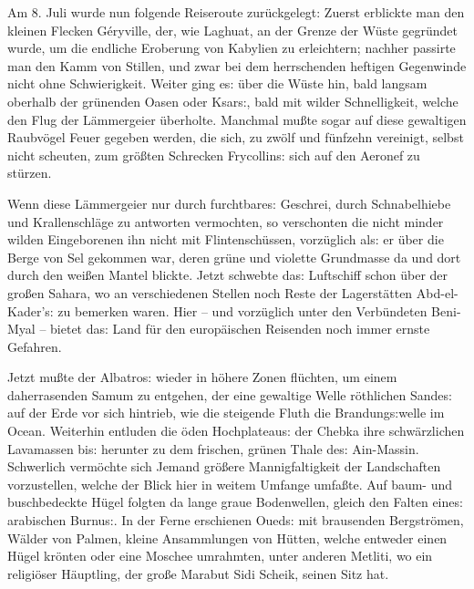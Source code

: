 \documentclass[oneside,12pt]{book}
\newcommand{\s}{s:}
\begin{document}
Am 8. Juli wurde nun folgende Reiseroute zur\"uckgelegt: Zuerst
erblickte man den kleinen Flecken G\'eryville, der, wie Laghuat, an
der Grenze der W\"uste gegr\"undet wurde, um die endliche Eroberung
von Kabylien zu erleichtern; nachher passirte man den Kamm von
Stillen, und zwar bei dem herrschenden heftigen Gegenwinde nicht ohne
Schwierigkeit. Weiter ging e{\s} \"uber die W\"uste hin, bald langsam
oberhalb der gr\"unenden Oasen oder Ksar{\s}, bald mit wilder
Schnelligkeit, welche den Flug der L\"ammergeier \"uberholte.
Manchmal mu{\ss}te sogar auf diese gewaltigen Raubv\"ogel Feuer
gegeben werden, die sich, zu zw\"olf und f\"unfzehn vereinigt, selbst
nicht scheuten, zum gr\"o{\ss}ten Schrecken Frycollin{\s} sich auf
den Aeronef zu st\"urzen.

Wenn diese L\"ammergeier nur durch furchtbare{\s} Geschrei, durch
Schnabelhiebe und Krallenschl\"age zu antworten vermochten, so
verschonten die nicht minder wilden Eingeborenen ihn nicht mit
Flintensch\"ussen, vorz\"uglich al{\s} er \"uber die Berge von Sel
gekommen war, deren gr\"une und violette Grundmasse da und dort durch
den wei{\ss}en Mantel blickte. Jetzt schwebte da{\s} Luftschiff schon
\"uber der gro{\ss}en Sahara, wo an verschiedenen Stellen noch Reste
der Lagerst\"atten Abd-el-Kader'{\s} zu bemerken waren. Hier -- und
vorz\"uglich unter den Verb\"undeten Beni-Myal -- bietet da{\s} Land
f\"ur den europ\"aischen Reisenden noch immer ernste Gefahren.

Jetzt mu{\ss}te der {\glqq}Albatro{\s}{\grqq} wieder in h\"ohere
Zonen fl\"uchten, um einem daherrasenden Samum zu entgehen, der eine
gewaltige Welle r\"othlichen Sande{\s} auf der Erde vor sich
hintrieb, wie die steigende Fluth die Brandung{\s}welle im Ocean.
Weiterhin entluden die \"oden Hochplateau{\s} der Chebka ihre
schw\"arzlichen Lavamassen bi{\s} herunter zu dem frischen, gr\"unen
Thale de{\s} Ain-Massin. Schwerlich verm\"ochte sich Jemand
gr\"o{\ss}ere Mannigfaltigkeit der Landschaften vorzustellen, welche
der Blick hier in weitem Umfange umfa{\ss}te. Auf baum- und
buschbedeckte H\"ugel folgten da lange graue Bodenwellen, gleich den
Falten eine{\s} arabischen Burnu{\s}. In der Ferne erschienen
{\glqq}Oued{\s}{\grqq} mit brausenden Bergstr\"omen, W\"alder von
Palmen, kleine Ansammlungen von H\"utten, welche entweder einen
H\"ugel kr\"onten oder eine Moschee umrahmten, unter anderen Metliti,
wo ein religi\"oser H\"auptling, der gro{\ss}e Marabut Sidi Scheik,
seinen Sitz hat.
\end{document}
